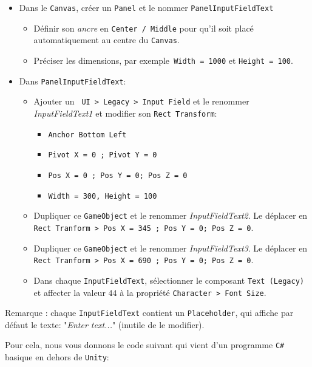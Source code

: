 \documentclass[a4paper,10pt]{article}
\newenvironment{solution}%
{\begin{tcolorbox}[breakable,colback=red!5!white,colframe=red!75!black,title=Solution]}%
{\end{tcolorbox}}
\begin{document}
\ifversionenseignant
\begin{solution}
	\begin{itemize}
		\item Dans le \texttt{Canvas}, créer un \texttt{Panel} et le nommer \texttt{PanelInputFieldText}
		\begin{itemize}
			\item Définir son \textit{ancre} en \texttt{Center / Middle} pour qu'il soit placé automatiquement au centre du \texttt{Canvas}.
			\item Préciser les dimensions, par exemple\texttt{ Width = 1000} et \texttt{Height = 100}.
		\end{itemize}
	\item Dans  \texttt{PanelInputFieldText}:
	\begin{itemize}
		\item Ajouter un \texttt{ UI > Legacy > Input Field} et le renommer \textit{InputFieldText1} et modifier son \texttt{Rect Transform}:
		\begin{itemize}
			\item \texttt{Anchor Bottom Left}
			\item \texttt{Pivot X = 0 ; Pivot Y = 0}
			\item \texttt{Pos X = 0 ; Pos Y = 0; Pos Z = 0}
			\item \texttt{Width = 300, Height = 100}
		\end{itemize}
		\item Dupliquer ce \texttt{GameObject} et le renommer \textit{InputFieldText2}. Le déplacer en \texttt{Rect Tranform > Pos X = 345 ; Pos Y = 0; Pos Z = 0}.
		\item Dupliquer ce \texttt{GameObject} et le renommer \textit{InputFieldText3}. Le déplacer en \texttt{Rect Tranform > Pos X = 690 ; Pos Y = 0; Pos Z = 0}.		
		\item  Dans chaque \texttt{InputFieldText}, sélectionner le composant \texttt{Text (Legacy) }et affecter la valeur $44$ à la propriété \texttt{Character > Font Size}.
	\end{itemize}		
	\end{itemize}

Remarque : chaque \texttt{InputFieldText} contient un \texttt{Placeholder}, qui affiche par défaut le texte: "\textit{Enter text...}" (inutile de le modifier).
\end{solution}	
\fi 

Pour cela, nous vous donnons le code suivant qui vient d'un programme \texttt{C\#} basique en dehors de \texttt{Unity}:
\end{document}
